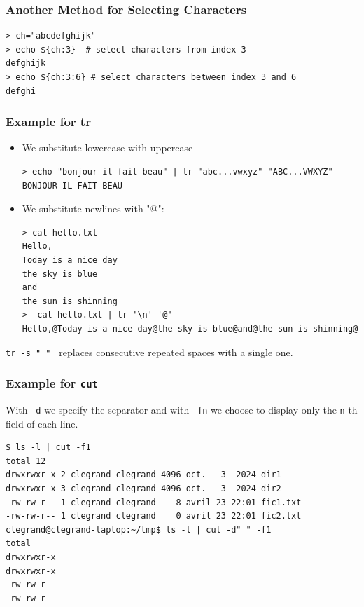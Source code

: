 \documentclass{beamer}
\newenvironment{terminal}{\color{white}\begin{snugshade*}}
{\end{snugshade*}\color{black}}
\begin{document}
\begin{frame}[fragile]
\frametitle{Another Method for Selecting Characters}
 \begin{terminal}
        \begin{scriptsize}
\begin{verbatim}
> ch="abcdefghijk"
> echo ${ch:3}  # select characters from index 3
defghijk
> echo ${ch:3:6} # select characters between index 3 and 6
defghi
\end{verbatim}
\end{scriptsize}
\end{terminal}


\end{frame}

\begin{frame}[fragile]

  \frametitle{Example for tr}
  \begin{itemize}
  \item We substitute lowercase with uppercase
    \begin{terminal}
    \begin{scriptsize}
\begin{verbatim}
> echo "bonjour il fait beau" | tr "abc...vwxyz" "ABC...VWXYZ"
BONJOUR IL FAIT BEAU
\end{verbatim}
    \end{scriptsize}
    \end{terminal}
  \item We substitute newlines with "@":
    \begin{terminal}
      \begin{scriptsize}
\begin{verbatim}
> cat hello.txt
Hello,
Today is a nice day
the sky is blue
and
the sun is shinning
>  cat hello.txt | tr '\n' '@'
Hello,@Today is a nice day@the sky is blue@and@the sun is shinning@
\end{verbatim}
      \end{scriptsize}
      \end{terminal}
  \end{itemize}
  \verb|tr -s " " | replaces consecutive repeated spaces with a single one.
\end{frame}


\begin{frame}[fragile]
  \frametitle{Example for \texttt{cut}}
  With \verb|-d| we specify the separator and with \verb|-fn| we choose to display only the \verb|n|-th field of each line.
  \begin{terminal}
    \begin{scriptsize}
\begin{verbatim}
$ ls -l | cut -f1
total 12
drwxrwxr-x 2 clegrand clegrand 4096 oct.   3  2024 dir1
drwxrwxr-x 3 clegrand clegrand 4096 oct.   3  2024 dir2
-rw-rw-r-- 1 clegrand clegrand    8 avril 23 22:01 fic1.txt
-rw-rw-r-- 1 clegrand clegrand    0 avril 23 22:01 fic2.txt
clegrand@clegrand-laptop:~/tmp$ ls -l | cut -d" " -f1
total
drwxrwxr-x
drwxrwxr-x
-rw-rw-r--
-rw-rw-r--
\end{verbatim}
    \end{scriptsize}
  \end{terminal}
\end{frame}
\end{document}
